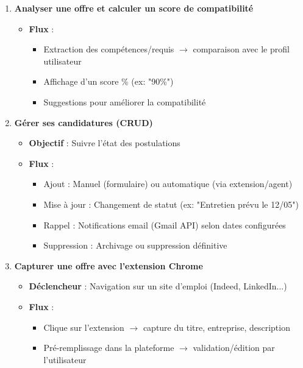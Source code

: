 \begin{enumerate}
    \item \textbf{Analyser une offre et calculer un score de compatibilité}
    \begin{itemize}
        \item \textbf{Flux} :
        \begin{itemize}
            \item Extraction des compétences/requis $\rightarrow$ comparaison avec le profil utilisateur
            \item Affichage d'un score \% (ex: "90\%")
            \item Suggestions pour améliorer la compatibilité
        \end{itemize}
    \end{itemize}

    \item \textbf{Gérer ses candidatures (CRUD)}
    \begin{itemize}
        \item \textbf{Objectif} : Suivre l'état des postulations
        \item \textbf{Flux} :
        \begin{itemize}
            \item Ajout : Manuel (formulaire) ou automatique (via extension/agent)
            \item Mise à jour : Changement de statut (ex: "Entretien prévu le 12/05")
            \item Rappel : Notifications email (Gmail API) selon dates configurées
            \item Suppression : Archivage ou suppression définitive
        \end{itemize}
    \end{itemize}

    \item \textbf{Capturer une offre avec l'extension Chrome}
    \begin{itemize}
        \item \textbf{Déclencheur} : Navigation sur un site d'emploi (Indeed, LinkedIn...)
        \item \textbf{Flux} :
        \begin{itemize}
            \item Clique sur l'extension $\rightarrow$ capture du titre, entreprise, description
            \item Pré-remplissage dans la plateforme $\rightarrow$ validation/édition par l'utilisateur
        \end{itemize}
    \end{itemize}


\end{enumerate}
